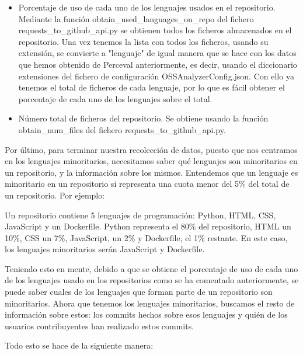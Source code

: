 \documentclass[a4paper, 12pt]{book}
\begin{document}
\begin{itemize}
  \item Porcentaje de uso de cada uno de los lenguajes usados en el repositorio. Mediante la función obtain\_used\_languages\_on\_repo del fichero requests\_to\_github\_api.py se obtienen todos los ficheros almacenados en el repositorio. Una vez tenemos la lista con todos los ficheros, usando su extensión, se convierte a "lenguaje" de igual manera que se hace con los datos que hemos obtenido de Perceval anteriormente, es decir, usando el diccionario extensiones del fichero de configuración OSSAnalyzerConfig.json. Con ello ya tenemos el total de ficheros de cada lenguaje, por lo que es fácil obtener el porcentaje de cada uno de los lenguajes sobre el total. 
  \item Número total de ficheros del repositorio. Se obtiene usando la función obtain\_num\_files del fichero requests\_to\_github\_api.py.
\end{itemize}

Por último, para terminar nuestra recolección de datos, puesto que nos centramos en los lenguajes minoritarios, necesitamos saber qué lenguajes son minoritarios en un repositorio, y la información sobre los mismos. Entendemos que un lenguaje es minoritario en un repositorio si representa una cuota menor del 5\% del total de un repositorio. Por ejemplo:

Un repositorio contiene 5 lenguajes de programación: Python, HTML, CSS, JavaScript y un Dockerfile. Python representa el 80\% del repositorio, HTML un 10\%, CSS un 7\%, JavaScript, un 2\% y Dockerfile, el 1\% restante. En este caso, los lenguajes minoritarios serán JavaScript y Dockerfile.

Teniendo esto en mente, debido a que se obtiene el porcentaje de uso de cada uno de los lenguajes usado en los repositorios como se ha comentado anteriormente, se puede saber cuales de los lenguajes que forman parte de un repositorio son minoritarios. Ahora que tenemos los lenguajes minoritarios, buscamos el resto de información sobre estos: los commits hechos sobre esos lenguajes y quién de los usuarios contribuyentes han realizado estos commits.

Todo esto se hace de la siguiente manera:
\end{document}
